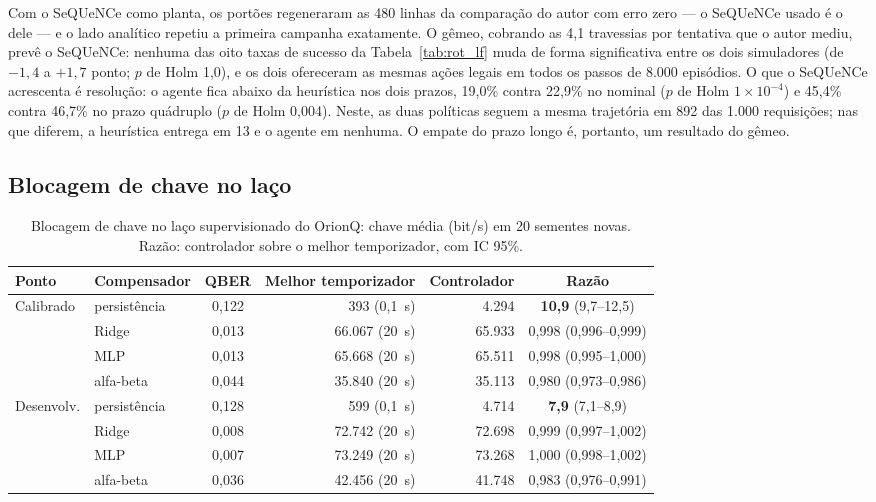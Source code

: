 \documentclass[12pt]{article}
\begin{document}
Com o SeQUeNCe como planta, os portões regeneraram as 480 linhas da comparação do
autor com erro zero --- o SeQUeNCe usado é o dele --- e o lado analítico repetiu a
primeira campanha exatamente. O gêmeo, cobrando as 4,1 travessias por tentativa que
o autor mediu, prevê o SeQUeNCe: nenhuma das oito taxas de sucesso da
Tabela~\ref{tab:rot_lf} muda de forma significativa entre os dois simuladores
(de $-1{,}4$ a $+1{,}7$ ponto; $p$ de Holm 1,0), e os dois ofereceram as mesmas
ações legais em todos os passos de 8.000 episódios. O que o SeQUeNCe acrescenta é
resolução: o agente fica abaixo da heurística nos dois prazos, 19,0\% contra
22,9\% no nominal ($p$ de Holm $1\times10^{-4}$) e 45,4\% contra 46,7\% no prazo
quádruplo ($p$ de Holm 0,004). Neste, as duas políticas seguem a mesma trajetória
em 892 das 1.000 requisições; nas que diferem, a heurística entrega em 13 e o
agente em nenhuma. O empate do prazo longo é, portanto, um resultado do gêmeo.

\subsection{Blocagem de chave no laço}
\label{sec:bloc_lf}

\begin{table}[ht]
\centering
\caption{Blocagem de chave no laço supervisionado do OrionQ: chave média (bit/s)
em 20 sementes novas. Razão: controlador sobre o melhor temporizador, com IC 95\%.}
\label{tab:bloc_lf}
\small
\setlength{\tabcolsep}{4pt}
\begin{tabular}{llcrrc}
\toprule
Ponto & Compensador & QBER & Melhor temporizador & Controlador & Razão \\
\midrule
Calibrado & persistência & 0,122 & 393 (0,1~s) & 4.294 & \textbf{10,9} (9,7--12,5) \\
 & Ridge & 0,013 & 66.067 (20~s) & 65.933 & 0,998 (0,996--0,999) \\
 & MLP & 0,013 & 65.668 (20~s) & 65.511 & 0,998 (0,995--1,000) \\
 & alfa-beta & 0,044 & 35.840 (20~s) & 35.113 & 0,980 (0,973--0,986) \\
Desenvolv. & persistência & 0,128 & 599 (0,1~s) & 4.714 & \textbf{7,9} (7,1--8,9) \\
 & Ridge & 0,008 & 72.742 (20~s) & 72.698 & 0,999 (0,997--1,002) \\
 & MLP & 0,007 & 73.249 (20~s) & 73.268 & 1,000 (0,998--1,002) \\
 & alfa-beta & 0,036 & 42.456 (20~s) & 41.748 & 0,983 (0,976--0,991) \\
\bottomrule
\end{tabular}
\end{table}
\end{document}
